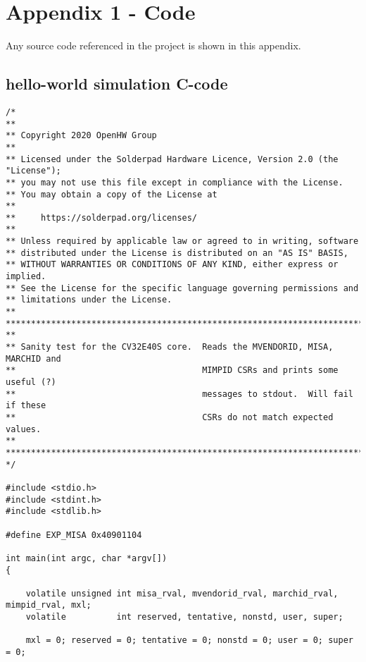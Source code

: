 \chapter{Appendix 1 - Code}
\label{app:appx1}

Any source code referenced in the project is shown in this appendix.

\section{hello-world simulation C-code}
\label{app:helloworldC}

\lstset{ 
   language=C,                   %
   breaklines=true,                %
   breakatwhitespace=false,        %
}
\begin{lstlisting}[caption={A sample C++ code}, label=lst:sample_code]
    /*
**
** Copyright 2020 OpenHW Group
**
** Licensed under the Solderpad Hardware Licence, Version 2.0 (the "License");
** you may not use this file except in compliance with the License.
** You may obtain a copy of the License at
**
**     https://solderpad.org/licenses/
**
** Unless required by applicable law or agreed to in writing, software
** distributed under the License is distributed on an "AS IS" BASIS,
** WITHOUT WARRANTIES OR CONDITIONS OF ANY KIND, either express or implied.
** See the License for the specific language governing permissions and
** limitations under the License.
**
*******************************************************************************
**
** Sanity test for the CV32E40S core.  Reads the MVENDORID, MISA, MARCHID and
**                                     MIMPID CSRs and prints some useful (?)
**                                     messages to stdout.  Will fail if these
**                                     CSRs do not match expected values.
**
*******************************************************************************
*/

#include <stdio.h>
#include <stdint.h>
#include <stdlib.h>

#define EXP_MISA 0x40901104

int main(int argc, char *argv[])
{

    volatile unsigned int misa_rval, mvendorid_rval, marchid_rval, mimpid_rval, mxl;
    volatile          int reserved, tentative, nonstd, user, super;

    mxl = 0; reserved = 0; tentative = 0; nonstd = 0; user = 0; super = 0;


\end{lstlisting}
